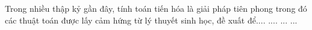 Trong nhiều thập kỷ gần đây, tính toán tiến hóa là giải pháp tiên phong trong đó các thuật toán được lấy cảm hứng từ lý thuyết sinh học, đề xuất để....
....
...
...


